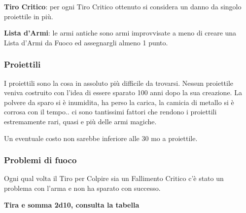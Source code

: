 \begin{multicols}{2}
\textbf{Tiro Critico}: per ogni Tiro Critico ottenuto si considera un danno da singolo proiettile in più.

\textbf{Lista d'Armi}: le armi antiche sono armi improvvisate a meno di creare una Lista d'Armi da Fuoco ed assegnargli almeno 1 punto.

\subsubsection*{Proiettili}

I proiettili sono la cosa in assoluto più difficile da trovarsi. Nessun proiettile veniva costruito con l'idea di essere sparato 100 anni dopo la sua creazione.
La polvere da sparo si è inumidita, ha perso la carica, la camicia di metallo si è corrosa con il tempo.. ci sono tantissimi fattori che rendono i proiettili estremamente rari, quasi e più delle armi magiche.

Un eventuale costo non sarebbe inferiore alle 30 mo a proiettile.

\subsubsection*{Problemi di fuoco}

Ogni qual volta il Tiro per Colpire sia un Fallimento Critico c'è stato un problema con l'arma e non ha sparato con successo.

\medskip

\textbf{Tira e somma 2d10, consulta la tabella}

\medskip


\end{multicols}

